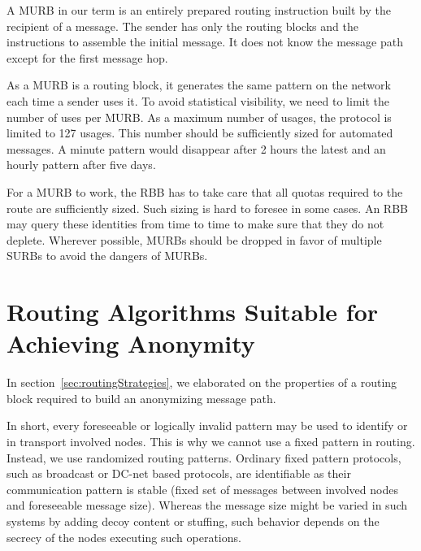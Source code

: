A MURB in our term is an entirely prepared routing instruction built by the recipient of a message. The sender has only the routing blocks and the instructions to assemble the initial message. It does not know the message path except for the first message hop.

As a MURB is a routing block, it generates the same pattern on the network each time a sender uses it. To avoid statistical visibility, we need to limit the number of uses per MURB. As a maximum number of usages, the protocol is limited to 127 usages. This number should be sufficiently sized for automated messages. A minute pattern would disappear after 2 hours the latest and an hourly pattern after five days.

For a MURB to work, the RBB has to take care that all quotas required to the route are sufficiently sized. Such sizing is hard to foresee in some cases. An RBB may query these identities from time to time to make sure that they do not deplete. Wherever possible, MURBs should be dropped in favor of multiple SURBs to avoid the dangers of MURBs.

\section{Routing Algorithms Suitable for Achieving Anonymity\label{sec:routingAlgorithm}}
In section~\ref{sec:routingStrategies}, we elaborated on the properties of a routing block required to build an anonymizing message path.

In short, every foreseeable or logically invalid pattern may be used to identify \VortexMessages{} or in transport involved nodes. This is why we cannot use a fixed pattern in routing. Instead, we use randomized routing patterns. Ordinary fixed pattern protocols, such as broadcast or DC-net based protocols, are identifiable as their communication pattern is stable (fixed set of messages between involved nodes and foreseeable message size). Whereas the message size might be varied in such systems by adding decoy content or stuffing, such behavior depends on the secrecy of the nodes executing such operations.

